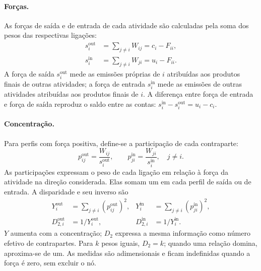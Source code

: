 \paragraph{Forças.}
As forças de saída e de entrada de cada atividade são calculadas pela soma dos pesos das respectivas ligações:
\begin{equation}
\begin{aligned}
s_i^{\mathrm{out}}&=\sum_{j\ne i}W_{ij}=c_i-F_{ii},\\
s_i^{\mathrm{in}}&=\sum_{j\ne i}W_{ji}=u_i-F_{ii}.
\end{aligned}
\label{eq:forcas-externas}
\end{equation}
A força de saída $s_i^{\mathrm{out}}$ mede as emissões próprias de $i$ atribuídas aos produtos finais de outras atividades; a força de entrada $s_i^{\mathrm{in}}$ mede as emissões de outras atividades atribuídas aos produtos finais de $i$. A diferença entre força de entrada e força de saída reproduz o saldo entre as contas: $s_i^{\mathrm{in}}-s_i^{\mathrm{out}}=u_i-c_i$.

\paragraph{Concentração.}
Para perfis com força positiva, define-se a participação de cada contraparte:
\begin{equation}
p_{ij}^{\mathrm{out}}=\frac{W_{ij}}{s_i^{\mathrm{out}}},\qquad
p_{ji}^{\mathrm{in}}=\frac{W_{ji}}{s_i^{\mathrm{in}}},\quad j\ne i.
\label{eq:participacoes-externas}
\end{equation}
As participações expressam o peso de cada ligação em relação à força da atividade na direção considerada. Elas somam um em cada perfil de saída ou de entrada. A disparidade e seu inverso são
\begin{equation}
\begin{aligned}
Y_i^{\mathrm{out}}&=\sum_{j\ne i}(p_{ij}^{\mathrm{out}})^2,&
Y_i^{\mathrm{in}}&=\sum_{j\ne i}(p_{ji}^{\mathrm{in}})^2,\\
D_{2,i}^{\mathrm{out}}&=1/Y_i^{\mathrm{out}},&
D_{2,i}^{\mathrm{in}}&=1/Y_i^{\mathrm{in}}.
\end{aligned}
\label{eq:disparidade}
\end{equation}
$Y$ aumenta com a concentração; $D_2$ expressa a mesma informação como número efetivo de contrapartes. Para $k$ pesos iguais, $D_2=k$; quando uma relação domina, aproxima-se de um. As medidas são adimensionais e ficam indefinidas quando a força é zero, sem excluir o nó.

